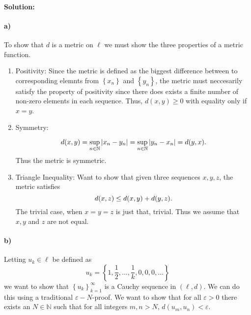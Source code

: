 \documentclass[a4paper]{article}
\theoremstyle{plain}
\begin{document}
\paragraph{Solution: }
\paragraph{a)}

To show that $d$ is a metric on $\ell$ we must show the three properties of a metric function.
\begin{enumerate}
  \item Positivity:
    Since the metric is defined as the biggest difference between to
    corresponding elemnts from $\left\{ x_n \right\}$ and $\left\{ y_n
    \right\}$, the metric must neccesarily satisfy the property of positivity
    since there does exists a finite number of non-zero elements in each sequence.
    Thus, $d(x, y) \geq 0$ with equality only if $x = y$. 
  \item Symmetry:
    
    \begin{equation}
      \notag
      d(x, y) = \sup_{n\in\mathbb{N}} |x_n - y_n| = \sup_{n\in\mathbb{N}}|y_n - x_n| = d(y, x).
    \end{equation}
    Thus the metric is symmetric.

  \item Triangle Inequality:
    Want to show that given three sequences $x, y, z$, the metric satisfies
    \begin{equation}
      \notag
      d(x, z) \leq d(x, y) + d(y, z).
    \end{equation}
    The trivial case, when $x = y = z$ is just that, trivial. Thus we assume
    that $x, y$ and $z$ are not equal.
        
\end{enumerate}

\paragraph{b)}

Letting $u_k \in \ell$ be defined as
\begin{equation}
  u_k = \left\{ 1, \frac{1}{2}, \dots, \frac{1}{k}, 0, 0, 0, \dots \right\}
\end{equation}
we want to show that $\left\{ u_k \right\}_{k=1}^{\infty}$ is a Cauchy sequence
in $(\ell, d)$. We can do this using a traditional $\varepsilon-N$-proof.  We
want to show that for all $\varepsilon > 0$ there exists an $N \in \mathbb{N}$
such that for all integers $m, n > N, \, d(u_m, u_n) < \varepsilon$.
\end{document}

